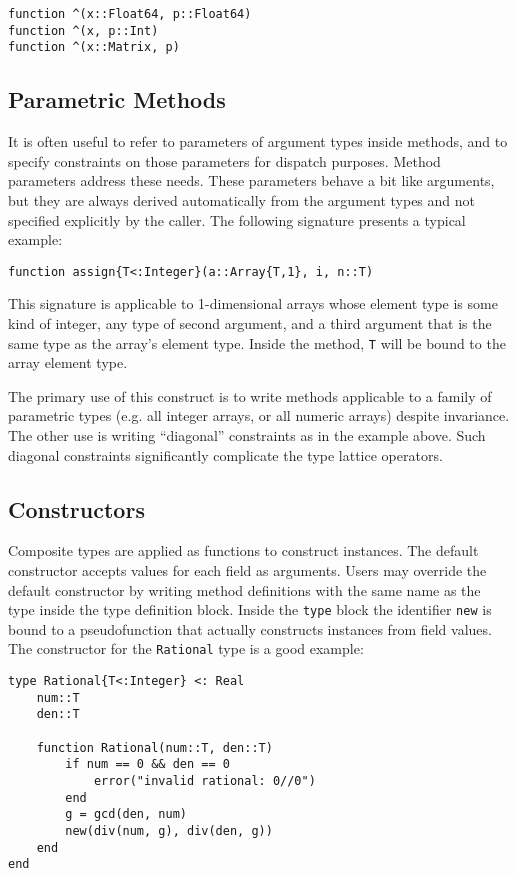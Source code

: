 \documentclass[9pt]{sigplanconf}
\begin{document}
\begin{verbatim}
function ^(x::Float64, p::Float64)
function ^(x, p::Int)
function ^(x::Matrix, p)
\end{verbatim}

\subsection{Parametric Methods}

It is often useful to refer to parameters of argument types inside methods,
and to specify constraints on those parameters for dispatch purposes.
Method parameters address these needs. These parameters behave a bit like
arguments, but they are always derived automatically from
the argument types and not specified explicitly by the caller.
The following signature presents a typical example:

\begin{verbatim}
function assign{T<:Integer}(a::Array{T,1}, i, n::T)
\end{verbatim}

This signature is applicable to 1-dimensional arrays whose element type is
some kind of integer, any type of second argument, and a third argument
that is the same type as the array's element type. Inside the method,
{\tt T} will be bound to the array element type.

The primary use of this construct is to write methods applicable to a
family of parametric types
(e.g. all integer arrays, or all numeric arrays)
despite invariance. The other use is
writing ``diagonal'' constraints as in the example above. Such diagonal
constraints significantly complicate the type lattice operators.


\subsection{Constructors}

Composite types are applied as functions to construct instances.
The default constructor accepts values for each field as arguments.
Users may override the default constructor by writing method definitions
with the same name as the type inside the type definition block. Inside the
{\tt type} block the identifier {\tt new} is bound to a pseudofunction
that actually constructs instances from field values. The constructor
for the {\tt Rational} type is a good example:

\begin{verbatim}
type Rational{T<:Integer} <: Real
    num::T
    den::T

    function Rational(num::T, den::T)
        if num == 0 && den == 0
            error("invalid rational: 0//0")
        end
        g = gcd(den, num)
        new(div(num, g), div(den, g))
    end
end
\end{verbatim}
\end{document}
